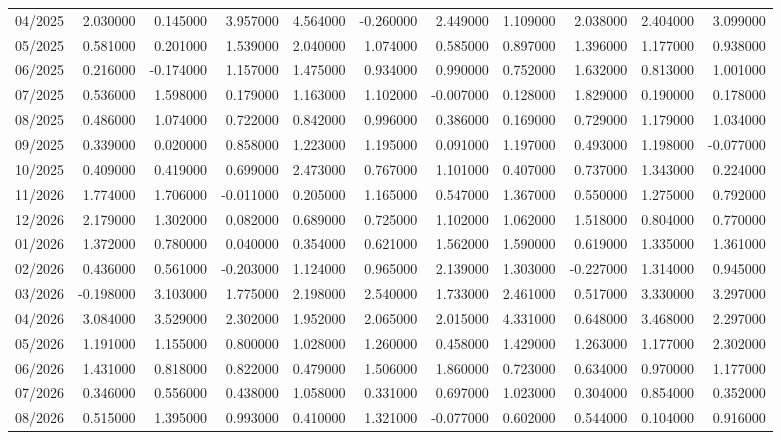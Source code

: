 \begin{tabular}{lrrrrrrrrrr}
04/2025 & 2.030000 & 0.145000 & 3.957000 & 4.564000 & -0.260000 & 2.449000 & 1.109000 & 2.038000 & 2.404000 & 3.099000 \\
05/2025 & 0.581000 & 0.201000 & 1.539000 & 2.040000 & 1.074000 & 0.585000 & 0.897000 & 1.396000 & 1.177000 & 0.938000 \\
06/2025 & 0.216000 & -0.174000 & 1.157000 & 1.475000 & 0.934000 & 0.990000 & 0.752000 & 1.632000 & 0.813000 & 1.001000 \\
07/2025 & 0.536000 & 1.598000 & 0.179000 & 1.163000 & 1.102000 & -0.007000 & 0.128000 & 1.829000 & 0.190000 & 0.178000 \\
08/2025 & 0.486000 & 1.074000 & 0.722000 & 0.842000 & 0.996000 & 0.386000 & 0.169000 & 0.729000 & 1.179000 & 1.034000 \\
09/2025 & 0.339000 & 0.020000 & 0.858000 & 1.223000 & 1.195000 & 0.091000 & 1.197000 & 0.493000 & 1.198000 & -0.077000 \\
10/2025 & 0.409000 & 0.419000 & 0.699000 & 2.473000 & 0.767000 & 1.101000 & 0.407000 & 0.737000 & 1.343000 & 0.224000 \\
11/2026 & 1.774000 & 1.706000 & -0.011000 & 0.205000 & 1.165000 & 0.547000 & 1.367000 & 0.550000 & 1.275000 & 0.792000 \\
12/2026 & 2.179000 & 1.302000 & 0.082000 & 0.689000 & 0.725000 & 1.102000 & 1.062000 & 1.518000 & 0.804000 & 0.770000 \\
01/2026 & 1.372000 & 0.780000 & 0.040000 & 0.354000 & 0.621000 & 1.562000 & 1.590000 & 0.619000 & 1.335000 & 1.361000 \\
02/2026 & 0.436000 & 0.561000 & -0.203000 & 1.124000 & 0.965000 & 2.139000 & 1.303000 & -0.227000 & 1.314000 & 0.945000 \\
03/2026 & -0.198000 & 3.103000 & 1.775000 & 2.198000 & 2.540000 & 1.733000 & 2.461000 & 0.517000 & 3.330000 & 3.297000 \\
04/2026 & 3.084000 & 3.529000 & 2.302000 & 1.952000 & 2.065000 & 2.015000 & 4.331000 & 0.648000 & 3.468000 & 2.297000 \\
05/2026 & 1.191000 & 1.155000 & 0.800000 & 1.028000 & 1.260000 & 0.458000 & 1.429000 & 1.263000 & 1.177000 & 2.302000 \\
06/2026 & 1.431000 & 0.818000 & 0.822000 & 0.479000 & 1.506000 & 1.860000 & 0.723000 & 0.634000 & 0.970000 & 1.177000 \\
07/2026 & 0.346000 & 0.556000 & 0.438000 & 1.058000 & 0.331000 & 0.697000 & 1.023000 & 0.304000 & 0.854000 & 0.352000 \\
08/2026 & 0.515000 & 1.395000 & 0.993000 & 0.410000 & 1.321000 & -0.077000 & 0.602000 & 0.544000 & 0.104000 & 0.916000 \\

\end{tabular}

